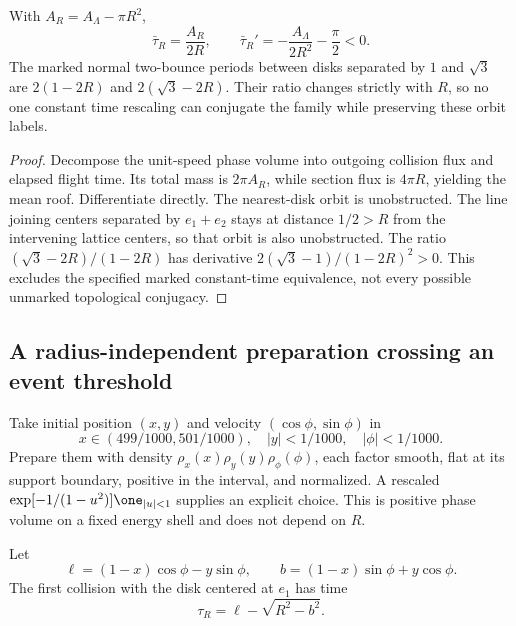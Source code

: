 \begin{proposition}\label{prop:roof}
With $A_R=A_\Lambda-\pi R^2$,
\[
 \bar\tau_R=\frac{A_R}{2R},\qquad
 \bar\tau_R'=-\frac{A_\Lambda}{2R^2}-\frac\pi2<0.
\]
The marked normal two-bounce periods between disks separated by $1$ and $\sqrt3$ are $2(1-2R)$ and $2(\sqrt3-2R)$. Their ratio changes strictly with $R$, so no one constant time rescaling can conjugate the family while preserving these orbit labels.
\end{proposition}
\begin{proof}
Decompose the unit-speed phase volume into outgoing collision flux and elapsed flight time. Its total mass is $2\pi A_R$, while section flux is $4\pi R$, yielding the mean roof. Differentiate directly. The nearest-disk orbit is unobstructed. The line joining centers separated by $e_1+e_2$ stays at distance $1/2>R$ from the intervening lattice centers, so that orbit is also unobstructed. The ratio $(\sqrt3-2R)/(1-2R)$ has derivative $2(\sqrt3-1)/(1-2R)^2>0$. This excludes the specified marked constant-time equivalence, not every possible unmarked topological conjugacy.
\end{proof}

\subsection{A radius-independent preparation crossing an event threshold}
Take initial position $(x,y)$ and velocity $(\cos\phi,\sin\phi)$ in
\[
 x\in(499/1000,501/1000),\quad |y|<1/1000,\quad|\phi|<1/1000.
\]
Prepare them with density $\rho_x(x)\rho_y(y)\rho_\phi(\phi)$, each factor smooth, flat at its support boundary, positive in the interval, and normalized. A rescaled $\exp[-1/(1-u^2)]\one_{|u|<1}$ supplies an explicit choice. This is positive phase volume on a fixed energy shell and does not depend on $R$.

Let
\[
 \ell=(1-x)\cos\phi-y\sin\phi,\qquad
 b=(1-x)\sin\phi+y\cos\phi.
\]
The first collision with the disk centered at $e_1$ has time
\begin{equation}
 \tau_R=\ell-\sqrt{R^2-b^2}.
 \label{eq:hit-time}
\end{equation}

